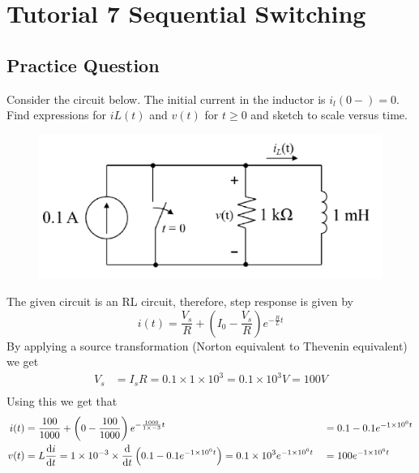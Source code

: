 \chapter{Tutorial 7 \- Sequential Switching}
\section{Practice Question}
Consider the circuit below. The initial current in the inductor is $i_l(0-) = 0$. Find expressions for
$iL(t)$ and $v(t)$ for $t \geq 0$ and sketch to scale versus time.
\begin{figure}[H]
    \centering
    \includegraphics[width=0.4\linewidth]{tutorials/figures/seq_switch_practice.png}
\end{figure}
The given circuit is an RL circuit, therefore, step response is given by
\begin{equation*}
    i(t) = \frac{V_s}{R} + \left(I_0 - \frac{V_s}{R}\right)e^{-\frac{R}{L}t}
\end{equation*}
By applying a source transformation (Norton equivalent to Thevenin equivalent) we get
\begin{align*}
    V_s &= I_s R = 0.1 \times 1 \times 10^3 = 0.1 \times 10^3 V = 100V\\
\end{align*}
Using this we get that
\begin{align*}
    i(t) &= \frac{100}{1000} + \left(0 - \frac{100}{1000}\right)e^{-\frac{1000}{1\times{-3}}t} &&= 0.1 - 0.1e^{-1\times10^6 t} \\
    v(t) &= L \odv{i}{t} = 1\times10^{-3} \times \odv{}{t} \left(0.1 - 0.1e^{-1\times10^6 t}\right) = 0.1\times10^3 e^{-1\times10^6 t} &&= 100e^{-1\times10^6 t}
\end{align*}
